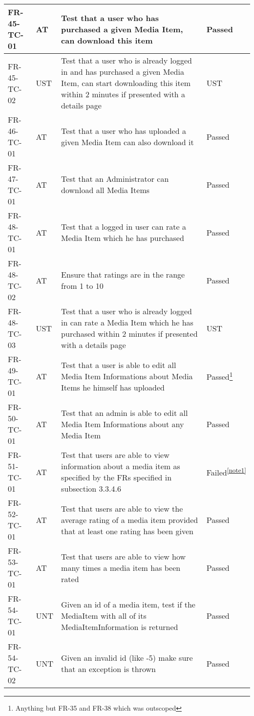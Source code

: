 \documentclass[../report.tex]{subfiles}
\newcommand{\footnoteref}[1]{\textsuperscript{\ref{#1}}}
\begin{document}
\begin{longtable}{|L{2.1cm}|L{1cm}|L{12.4cm}|L{1.4cm}|}
FR-45-TC-01&AT&Test that a user who has purchased a given Media Item, can download this item&Passed  \\ \hline
FR-45-TC-02&UST&Test that a user who is already logged in and has purchased a given Media Item, can start downloading this item within 2 minutes if presented with a details page&UST  \\ \hline
FR-46-TC-01&AT&Test that a user who has uploaded a given Media Item can also download it&Passed  \\ \hline
FR-47-TC-01&AT&Test that an Administrator can download all Media Items&Passed  \\ \hline
FR-48-TC-01&AT&Test that a logged in user can rate a Media Item which he has purchased&Passed  \\ \hline
FR-48-TC-02&AT&Ensure that ratings are in the range from 1 to 10&Passed  \\ \hline
FR-48-TC-03&UST&Test that a user who is already logged in can rate a Media Item which he has purchased within 2 minutes if presented with a details page&UST  \\ \hline
FR-49-TC-01&AT&Test that a user is able to edit all Media Item Informations about Media Items he himself has uploaded&Passed\footnote{Anything but FR-35 and FR-38 which was outscoped}  \\ \hline
FR-50-TC-01&AT&Test that an admin is able to edit all Media Item Informations about any Media Item&Passed  \\ \hline
FR-51-TC-01&AT&Test that users are able to view information about a media item as specified by the FRs specified in subsection 3.3.4.6&Failed\footnoteref{note1}  \\ \hline
FR-52-TC-01&AT&Test that users are able to view the average rating of a media item provided that at least one rating has been given&Passed  \\ \hline
FR-53-TC-01&AT&Test that users are able to view how many times a media item has been rated&Passed  \\ \hline
FR-54-TC-01&UNT&Given an id of a media item, test if the MediaItem with all of its MediaItemInformation is returned&Passed  \\ \hline
FR-54-TC-02&UNT&Given an invalid id (like -5) make sure that an exception is thrown&Passed  \\ \hline

\end{longtable}
\end{document}
